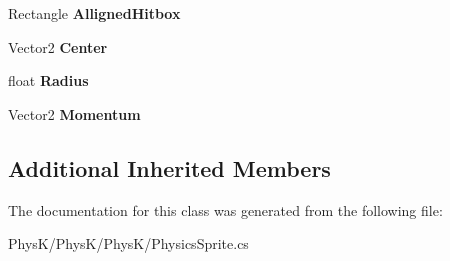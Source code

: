\begin{DoxyCompactItemize}
\item 
Rectangle {\bfseries Alligned\+Hitbox}\hypertarget{class_phys_k_1_1_physics_sprite_a74026774de649a349d0c5fcdaececcf6}{}\label{class_phys_k_1_1_physics_sprite_a74026774de649a349d0c5fcdaececcf6}

\item 
Vector2 {\bfseries Center}\hypertarget{class_phys_k_1_1_physics_sprite_adb710fdf51c89dd500940d04c2c4a41f}{}\label{class_phys_k_1_1_physics_sprite_adb710fdf51c89dd500940d04c2c4a41f}

\item 
float {\bfseries Radius}\hypertarget{class_phys_k_1_1_physics_sprite_a67d012f8d8364de0c9b50da9c1b80771}{}\label{class_phys_k_1_1_physics_sprite_a67d012f8d8364de0c9b50da9c1b80771}

\item 
Vector2 {\bfseries Momentum}\hypertarget{class_phys_k_1_1_physics_sprite_a43db585d8210c156cc6123c93ce663f6}{}\label{class_phys_k_1_1_physics_sprite_a43db585d8210c156cc6123c93ce663f6}

\end{DoxyCompactItemize}
\subsection*{Additional Inherited Members}


The documentation for this class was generated from the following file\+:\begin{DoxyCompactItemize}
\item 
Phys\+K/\+Phys\+K/\+Phys\+K/Physics\+Sprite.\+cs\end{DoxyCompactItemize}
